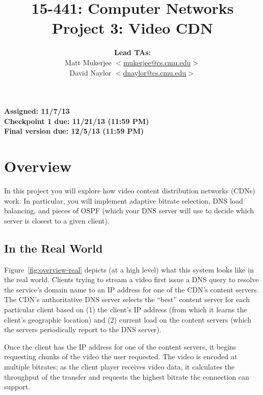 \documentclass{article}
\title{	15-441: Computer Networks\\
Project 3: Video CDN\\
}
\author{\textbf{Lead TAs:}\\ 
             Matt Mukerjee
             $<$\href{mailto:mukerjee@cs.cmu.edu}{mukerjee@cs.cmu.edu}$>$\\
			 David Naylor
             $<$\href{mailto:dnaylor@cs.cmu.edu}{dnaylor@cs.cmu.edu}$>$}
\date{}
\begin{document}
\maketitle

\large{\noindent \textbf{Assigned: 11/7/13\\
Checkpoint 1 due: 11/21/13 (11:59 PM)\\
Final version due: 12/5/13 (11:59 PM)}}


\section{Overview}

In this project you will explore how video content distribution networks (CDNs)
work. In particular, you will implement adaptive bitrate selection, DNS load
balancing, and pieces of OSPF (which your DNS server will use to decide which
server is closest to a given client).

\subsection{In the Real World}

Figure~\ref{fig:overview-real} depicts (at a high level) what this system looks
like in the real world. Clients trying to stream a video first issue a DNS
query to resolve the service's domain name to an IP address for one of the
CDN's content servers. The CDN's authoritative DNS server selects the ``best''
content server for each particular client based on (1) the client's IP address
(from which it learns the client's geographic location) and (2) current load on
the content servers (which the servers periodically report to the DNS server).

Once the client has the IP address for one of the content servers, it begins
requesting chunks of the video the user requested. The video is encoded at
multiple bitrates; as the client player receives video data, it calculates the
throughput of the transfer and requests the highest bitrate the connection can
support.
\end{document}
